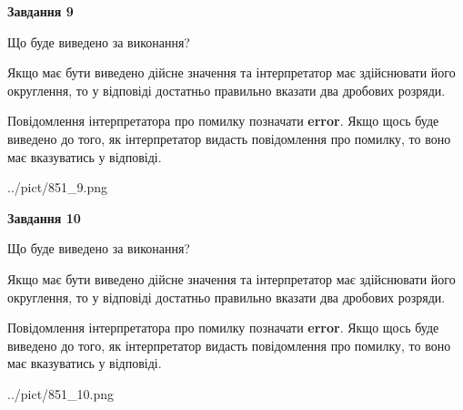 \documentclass[12pt, ukrainian]{article}
\begin{document}
{\begin {Large}
{\begin {center}\textbf{Завдання 9}\end {center}}\par
Що буде виведено за виконання? \par

Якщо має бути виведено дійсне значення та інтерпретатор має здійснювати його округлення, 
то у відповіді достатньо правильно вказати два дробових розряди.

Повідомлення інтерпретатора про помилку позначати \textbf{error}.
Якщо щось буде виведено до того, як інтерпретатор видасть повідомлення про помилку, 
то воно має вказуватись у відповіді. \par

\begin{center}
	{../pict/851_9.png}
\end{center}
\newpage

{\begin {center}\textbf{Завдання 10}\end {center}}\par
Що буде виведено за виконання? \par

Якщо має бути виведено дійсне значення та інтерпретатор має здійснювати його округлення, 
то у відповіді достатньо правильно вказати два дробових розряди.

Повідомлення інтерпретатора про помилку позначати \textbf{error}.
Якщо щось буде виведено до того, як інтерпретатор видасть повідомлення про помилку, 
то воно має вказуватись у відповіді. \par

\begin{center}
	{../pict/851_10.png}
\end{center}
\newpage

\end {Large}}
\end{document}
